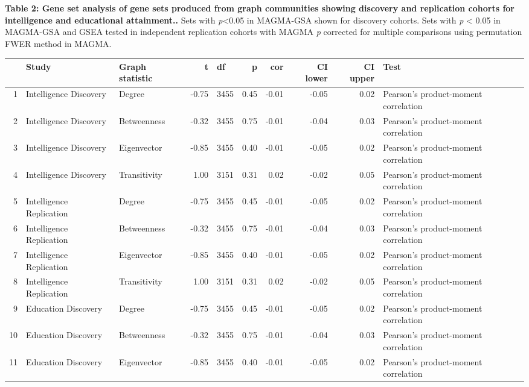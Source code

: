 \textbf{Table 2: Gene set analysis of gene sets produced from graph communities showing discovery and replication cohorts for intelligence and educational attainment..} Sets with \emph{p}\textless{}0.05 in MAGMA-GSA shown for discovery cohorts. Sets with \emph{p} \textless{} 0.05 in MAGMA-GSA and GSEA tested in independent replication cohorts with MAGMA \emph{p} corrected for multiple comparisons using permutation FWER method in MAGMA.

\begin{table}[ht]
\centering
\begin{tabular}{rllrlrrrrl}
  \hline
 & Study & Graph statistic & t & df & p & cor & CI lower & CI upper & Test \\ 
  \hline
1 & Intelligence Discovery & Degree & -0.75 & 3455 & 0.45 & -0.01 & -0.05 & 0.02 & Pearson's product-moment correlation \\ 
  2 & Intelligence Discovery & Betweenness & -0.32 & 3455 & 0.75 & -0.01 & -0.04 & 0.03 & Pearson's product-moment correlation \\ 
  3 & Intelligence Discovery & Eigenvector & -0.85 & 3455 & 0.40 & -0.01 & -0.05 & 0.02 & Pearson's product-moment correlation \\ 
  4 & Intelligence Discovery & Transitivity & 1.00 & 3151 & 0.31 & 0.02 & -0.02 & 0.05 & Pearson's product-moment correlation \\ 
  5 & Intelligence Replication & Degree & -0.75 & 3455 & 0.45 & -0.01 & -0.05 & 0.02 & Pearson's product-moment correlation \\ 
  6 & Intelligence Replication & Betweenness & -0.32 & 3455 & 0.75 & -0.01 & -0.04 & 0.03 & Pearson's product-moment correlation \\ 
  7 & Intelligence Replication & Eigenvector & -0.85 & 3455 & 0.40 & -0.01 & -0.05 & 0.02 & Pearson's product-moment correlation \\ 
  8 & Intelligence Replication & Transitivity & 1.00 & 3151 & 0.31 & 0.02 & -0.02 & 0.05 & Pearson's product-moment correlation \\ 
  9 & Education Discovery & Degree & -0.75 & 3455 & 0.45 & -0.01 & -0.05 & 0.02 & Pearson's product-moment correlation \\ 
  10 & Education Discovery & Betweenness & -0.32 & 3455 & 0.75 & -0.01 & -0.04 & 0.03 & Pearson's product-moment correlation \\ 
  11 & Education Discovery & Eigenvector & -0.85 & 3455 & 0.40 & -0.01 & -0.05 & 0.02 & Pearson's product-moment correlation \\ 

\end{tabular}
\end{table}
